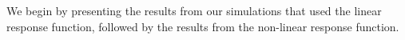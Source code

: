 \documentclass{article}
\begin{document}

	
	We begin by presenting the results from our simulations that used the linear response function, followed by the results from the non-linear response function.
	

\end{document}
